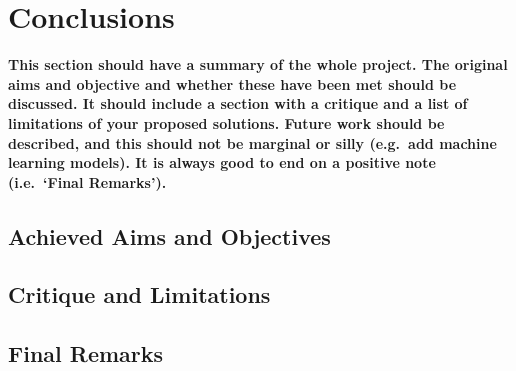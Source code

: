 \chapter{Conclusions}
\textbf{This section should have a summary of the whole project.  The original aims and objective and whether these have been met should be discussed. It should include a section with a critique and a list of limitations of your proposed solutions.  Future work should be described, and this should not be marginal or silly (e.g.\ add machine learning models).  It is always good to end on a positive note (i.e.\ `Final Remarks').}

\section{Achieved Aims and Objectives}
\blindtext

\section{Critique and Limitations}
\blindtext

\section{Final Remarks}
\blindtext
